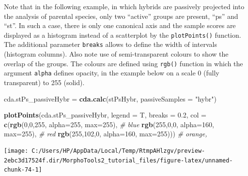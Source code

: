 \documentclass[
]{article}
\newenvironment{Shaded}{\begin{snugshade}}{\end{snugshade}}
\newcommand{\CommentTok}[1]{\textcolor[rgb]{0.56,0.35,0.01}{\textit{#1}}}
\newcommand{\DataTypeTok}[1]{\textcolor[rgb]{0.13,0.29,0.53}{#1}}
\newcommand{\DecValTok}[1]{\textcolor[rgb]{0.00,0.00,0.81}{#1}}
\newcommand{\FloatTok}[1]{\textcolor[rgb]{0.00,0.00,0.81}{#1}}
\newcommand{\KeywordTok}[1]{\textcolor[rgb]{0.13,0.29,0.53}{\textbf{#1}}}
\newcommand{\NormalTok}[1]{#1}
\newcommand{\StringTok}[1]{\textcolor[rgb]{0.31,0.60,0.02}{#1}}
\begin{document}
Note that in the following example, in which hybrids are passively
projected into the analysis of parental species, only two ``active''
groups are present, ``ps'' and ``st''. In such a case, there is only one
canonical axis and the sample scores are displayed as a histogram
instead of a scatterplot by the \texttt{plotPoints()} function. The
additional parameter \texttt{breaks} allows to define the width of
intervals (histogram columns). Also note use of semi-transparent colours
to show the overlap of the groups. The colours are defined using
\texttt{rgb()} function in which the argument \texttt{alpha} defines
opacity, in the example below on a scale 0 (fully transparent) to 255
(solid).

\begin{Shaded}
\begin{Highlighting}[]

\NormalTok{cda.stPs_passiveHybr =}\StringTok{ }\KeywordTok{cda.calc}\NormalTok{(stPsHybr, }\DataTypeTok{passiveSamples =} \StringTok{"hybr"}\NormalTok{)}

\KeywordTok{plotPoints}\NormalTok{(cda.stPs_passiveHybr, }\DataTypeTok{legend =}\NormalTok{ T, }\DataTypeTok{breaks =} \FloatTok{0.2}\NormalTok{,}
                \DataTypeTok{col =} \KeywordTok{c}\NormalTok{(}\KeywordTok{rgb}\NormalTok{(}\DecValTok{0}\NormalTok{,}\DecValTok{0}\NormalTok{,}\DecValTok{255}\NormalTok{, }\DataTypeTok{alpha=}\DecValTok{255}\NormalTok{, }\DataTypeTok{max=}\DecValTok{255}\NormalTok{), }\CommentTok{# blue}
                        \KeywordTok{rgb}\NormalTok{(}\DecValTok{255}\NormalTok{,}\DecValTok{0}\NormalTok{,}\DecValTok{0}\NormalTok{, }\DataTypeTok{alpha=}\DecValTok{160}\NormalTok{, }\DataTypeTok{max=}\DecValTok{255}\NormalTok{), }\CommentTok{# red}
                        \KeywordTok{rgb}\NormalTok{(}\DecValTok{255}\NormalTok{,}\DecValTok{102}\NormalTok{,}\DecValTok{0}\NormalTok{, }\DataTypeTok{alpha=}\DecValTok{160}\NormalTok{, }\DataTypeTok{max=}\DecValTok{255}\NormalTok{))) }\CommentTok{# orange, }
\end{Highlighting}
\end{Shaded}

\begin{center}\texttt{[image: C:/Users/HP/AppData/Local/Temp/RtmpAHlzgv/preview-2ebc3d17524f.dir/MorphoTools2\_tutorial\_files/figure-latex/unnamed-chunk-74-1]} \end{center}
\end{document}
